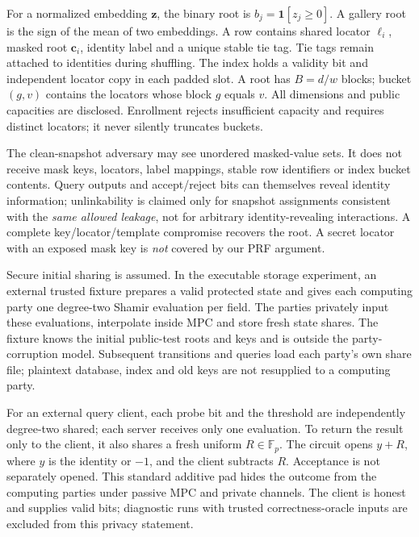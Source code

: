 \documentclass[journal]{IEEEtran}
\begin{document}
For a normalized embedding $\mathbf z$, the binary root is $b_j=\mathbf1[z_j\ge0]$. A gallery root is the sign of the mean of two embeddings. A row contains shared locator $\ell_i$, masked root $\mathbf c_i$, identity label and a unique stable tie tag. Tie tags remain attached to identities during shuffling. The index holds a validity bit and independent locator copy in each padded slot. A root has $B=d/w$ blocks; bucket $(g,v)$ contains the locators whose block $g$ equals $v$. All dimensions and public capacities are disclosed. Enrollment rejects insufficient capacity and requires distinct locators; it never silently truncates buckets.

The clean-snapshot adversary may see unordered masked-value sets. It does not receive mask keys, locators, label mappings, stable row identifiers or index bucket contents. Query outputs and accept/reject bits can themselves reveal identity information; unlinkability is claimed only for snapshot assignments consistent with the \emph{same allowed leakage}, not for arbitrary identity-revealing interactions. A complete key/locator/template compromise recovers the root. A secret locator with an exposed mask key is \emph{not} covered by our PRF argument.

Secure initial sharing is assumed. In the executable storage experiment, an external trusted fixture prepares a valid protected state and gives each computing party one degree-two Shamir evaluation per field. The parties privately input these evaluations, interpolate inside MPC and store fresh state shares. The fixture knows the initial public-test roots and keys and is outside the party-corruption model. Subsequent transitions and queries load each party's own share file; plaintext database, index and old keys are not resupplied to a computing party.

For an external query client, each probe bit and the threshold are independently degree-two shared; each server receives only one evaluation. To return the result only to the client, it also shares a fresh uniform $R\in\mathbb F_p$. The circuit opens $y+R$, where $y$ is the identity or $-1$, and the client subtracts $R$. Acceptance is not separately opened. This standard additive pad hides the outcome from the computing parties under passive MPC and private channels. The client is honest and supplies valid bits; diagnostic runs with trusted correctness-oracle inputs are excluded from this privacy statement.
\end{document}
